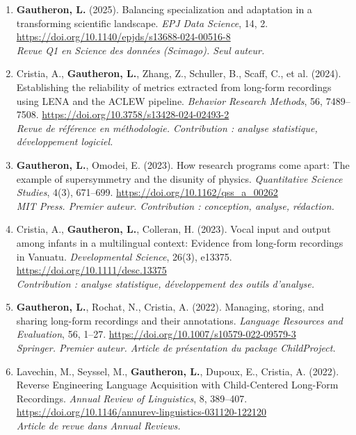 \documentclass[11pt,a4paper]{article}
\begin{document}
\begin{enumerate}
    \item \textbf{Gautheron, L.} (2025). Balancing specialization and adaptation in a transforming scientific landscape. \textit{EPJ Data Science}, 14, 2. \url{https://doi.org/10.1140/epjds/s13688-024-00516-8}\\
    \textit{Revue Q1 en Science des données (Scimago). Seul auteur.}
    
    \item Cristia, A., \textbf{Gautheron, L.}, Zhang, Z., Schuller, B., Scaff, C., et al. (2024). Establishing the reliability of metrics extracted from long-form recordings using LENA and the ACLEW pipeline. \textit{Behavior Research Methods}, 56, 7489--7508. \url{https://doi.org/10.3758/s13428-024-02493-2}\\
    \textit{Revue de référence en méthodologie. Contribution : analyse statistique, développement logiciel.}
    
    \item \textbf{Gautheron, L.}, Omodei, E. (2023). How research programs come apart: The example of supersymmetry and the disunity of physics. \textit{Quantitative Science Studies}, 4(3), 671--699. \url{https://doi.org/10.1162/qss_a_00262}\\
    \textit{MIT Press. Premier auteur. Contribution : conception, analyse, rédaction.}
    
    \item Cristia, A., \textbf{Gautheron, L.}, Colleran, H. (2023). Vocal input and output among infants in a multilingual context: Evidence from long-form recordings in Vanuatu. \textit{Developmental Science}, 26(3), e13375. \url{https://doi.org/10.1111/desc.13375}\\
    \textit{Contribution : analyse statistique, développement des outils d'analyse.}
    
    \item \textbf{Gautheron, L.}, Rochat, N., Cristia, A. (2022). Managing, storing, and sharing long-form recordings and their annotations. \textit{Language Resources and Evaluation}, 56, 1--27. \url{https://doi.org/10.1007/s10579-022-09579-3}\\
    \textit{Springer. Premier auteur. Article de présentation du package ChildProject.}
    
    \item Lavechin, M., Seyssel, M., \textbf{Gautheron, L.}, Dupoux, E., Cristia, A. (2022). Reverse Engineering Language Acquisition with Child-Centered Long-Form Recordings. \textit{Annual Review of Linguistics}, 8, 389--407. \url{https://doi.org/10.1146/annurev-linguistics-031120-122120}\\
    \textit{Article de revue dans Annual Reviews.}
\end{enumerate}
\end{document}
